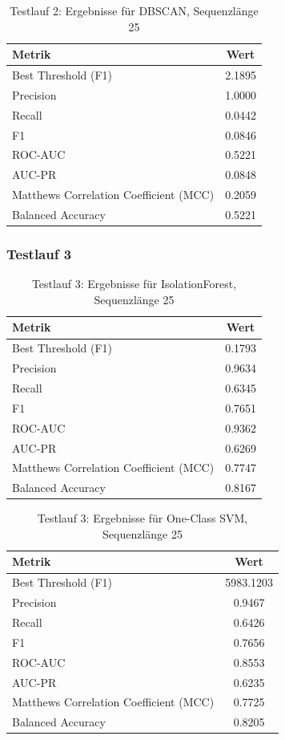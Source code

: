 \documentclass[a4paper,12pt]{article}
\begin{document}
\begin{table}[H]
	\centering
	\begin{tabular}{l c}
		\hline
		Metrik & Wert \\
		\hline
		Best Threshold (F1) & 2.1895 \\
		Precision & 1.0000 \\
		Recall & 0.0442 \\
		F1 & 0.0846 \\
		ROC-AUC & 0.5221 \\
		AUC-PR & 0.0848 \\
		Matthews Correlation Coefficient (MCC) & 0.2059 \\
		Balanced Accuracy & 0.5221 \\
		\hline
	\end{tabular}
	\caption{Testlauf 2: Ergebnisse für DBSCAN, Sequenzlänge 25}
\end{table}

\subsubsection{Testlauf 3}

\begin{table}[H]
	\centering
	\begin{tabular}{l c}
		\hline
		Metrik & Wert \\
		\hline
		Best Threshold (F1) & 0.1793 \\
		Precision & 0.9634 \\
		Recall & 0.6345 \\
		F1 & 0.7651 \\
		ROC-AUC & 0.9362 \\
		AUC-PR & 0.6269 \\
		Matthews Correlation Coefficient (MCC) & 0.7747 \\
		Balanced Accuracy & 0.8167 \\
		\hline
	\end{tabular}
	\caption{Testlauf 3: Ergebnisse für IsolationForest, Sequenzlänge 25}
\end{table}

\begin{table}[H]
	\centering
	\begin{tabular}{l c}
		\hline
		Metrik & Wert \\
		\hline
		Best Threshold (F1) & 5983.1203 \\
		Precision & 0.9467 \\
		Recall & 0.6426 \\
		F1 & 0.7656 \\
		ROC-AUC & 0.8553 \\
		AUC-PR & 0.6235 \\
		Matthews Correlation Coefficient (MCC) & 0.7725 \\
		Balanced Accuracy & 0.8205 \\
		\hline
	\end{tabular}
	\caption{Testlauf 3: Ergebnisse für One-Class SVM, Sequenzlänge 25}
\end{table}
\end{document}

